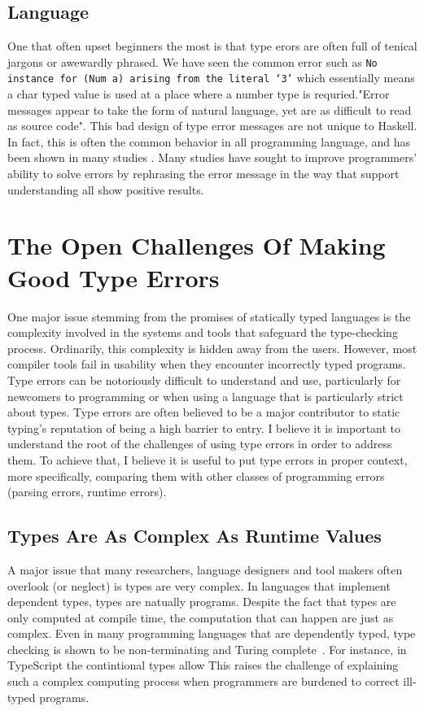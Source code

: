 \subsection{Language}

One that often upset beginners the most is that type erors are often full of tenical jargons or awewardly phrased. We have seen the common error such as \texttt{No instance for (Num a) arising from the literal `3'} which essentially means a char typed value is used at a place where a number type is requried."Error messages appear to take the form of natural language, yet are as difficult to read as source code". This bad design of type error messages are not unique to Haskell. In fact, this is often the common behavior in all programming language, and has been shown in many studies \cite{Barik2017-gy, Tirronen2015-nr, Prather2017-dg}. Many studies have sought to improve programmers' ability to solve errors by rephrasing the error message in the way that support understanding \cite{Becker2016-kc,Barik2014-ib} all show positive results.


\section{The Open Challenges Of Making Good Type Errors}

One major issue stemming from the promises of statically typed languages is the complexity involved in the systems and tools that safeguard the type-checking process. Ordinarily, this complexity is hidden away from the users. However, most compiler tools fail in usability when they encounter incorrectly typed programs. Type errors can be notoriously difficult to understand and use, particularly for newcomers to programming or when using a language that is particularly strict about types. Type errors are often believed to be a major contributor to static typing's reputation of being a high barrier to entry. I believe it is important to understand the root of the challenges of using type errors in order to address them. To achieve that, I believe it is useful to put type errors in proper context, more specifically, comparing them with other classes of programming errors (parsing errors, runtime errors). 

\subsection{Types Are As Complex As Runtime Values}
A major issue that many researchers, language designers and tool makers often overlook (or neglect) is types are very complex. In languages that implement dependent types, types are natually programs. Despite the fact that types are only computed at compile time, the computation that can happen are just as complex. Even in many programming languages that are dependently typed, type checking is shown to be non-terminating and Turing complete~\cite{Wells1999-ob}. For instance, in TypeScript the contintional types allow  This raises the challenge of explaining such a complex computing process when programmers are burdened to correct ill-typed programs. 


